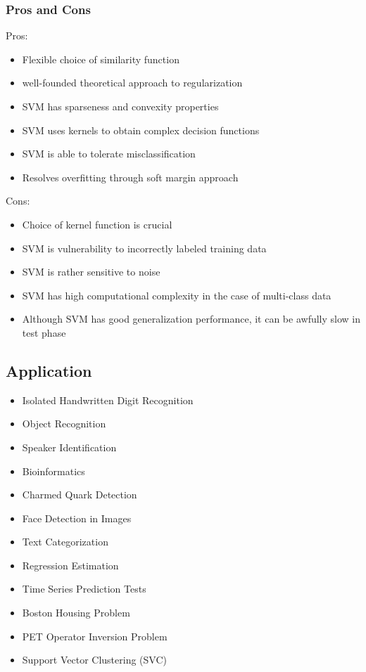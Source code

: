 \documentclass{tron}
\begin{document}
\subsubsection{Pros and Cons}
\begin{remark}{}
Pros:
\begin{itemize}
	\item Flexible choice of similarity function
	\item well-founded theoretical approach to regularization
	\item SVM has sparseness and convexity properties
	\item SVM uses kernels to obtain complex decision functions
	\item SVM is able to tolerate misclassification
	\item Resolves overfitting through soft margin approach
\end{itemize}

Cons:
\begin{itemize}
	\item Choice of kernel function is crucial
	\item SVM is vulnerability to incorrectly labeled training data
	\item SVM is rather sensitive to noise
	\item SVM has high computational complexity in the case of multi-class data
	\item Although SVM has good generalization performance, it can be awfully slow in test phase
\end{itemize}	
\end{remark}


\newpage
\subsection{Application}
\begin{example}{}
\begin{itemize}
	\item Isolated Handwritten Digit Recognition
	\item Object Recognition
	\item Speaker Identification
	\item Bioinformatics
	\item Charmed Quark Detection
	\item Face Detection in Images 
	\item Text Categorization
	\item Regression Estimation
	\item Time Series Prediction Tests
	\item Boston Housing Problem
	\item PET Operator Inversion Problem
	\item Support Vector Clustering (SVC)
\end{itemize}
\end{example}
\end{document}
